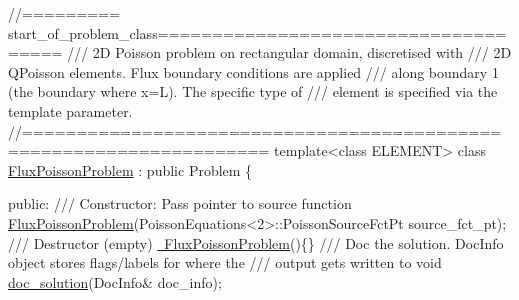  
\begin{DoxyCodeInclude}
\textcolor{comment}{//========= start\_of\_problem\_class=====================================}
\textcolor{comment}{/// 2D Poisson problem on rectangular domain, discretised with}
\textcolor{comment}{}\textcolor{comment}{/// 2D QPoisson elements. Flux boundary conditions are applied}
\textcolor{comment}{}\textcolor{comment}{/// along boundary 1 (the boundary where x=L). The specific type of }
\textcolor{comment}{}\textcolor{comment}{/// element is specified via the template parameter.}
\textcolor{comment}{}\textcolor{comment}{//====================================================================}
\textcolor{keyword}{template}<\textcolor{keyword}{class} ELEMENT> 
\textcolor{keyword}{class }\hyperlink{classFluxPoissonProblem}{FluxPoissonProblem} : \textcolor{keyword}{public} Problem
\{

\textcolor{keyword}{public}:
\textcolor{comment}{}
\textcolor{comment}{ /// Constructor: Pass pointer to source function}
\textcolor{comment}{} \hyperlink{classFluxPoissonProblem_a1b57e0c67634586cb69fbeeec7874e36}{FluxPoissonProblem}(PoissonEquations<2>::PoissonSourceFctPt source\_fct\_pt);
\textcolor{comment}{}
\textcolor{comment}{ /// Destructor (empty)}
\textcolor{comment}{} \hyperlink{classFluxPoissonProblem_afe4848aa1478883fa4dd59abbd7c7547}{~FluxPoissonProblem}()\{\}
\textcolor{comment}{}
\textcolor{comment}{ /// Doc the solution. DocInfo object stores flags/labels for where the}
\textcolor{comment}{ /// output gets written to}
\textcolor{comment}{} \textcolor{keywordtype}{void} \hyperlink{classFluxPoissonProblem_ae410950b9dc1f2bd4991480df15a1586}{doc\_solution}(DocInfo& doc\_info);


\end{DoxyCodeInclude}
